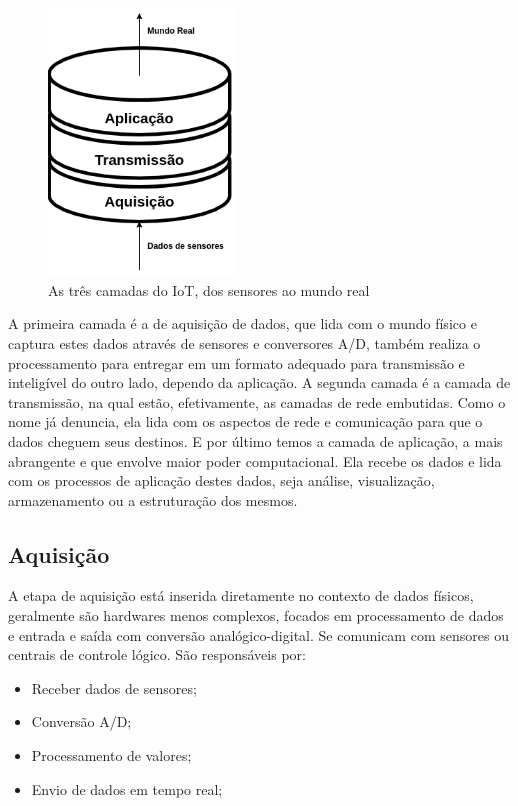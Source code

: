 \begin{figure}[h!]
\centering
\includegraphics[width=5cm]{./02_Capitulos/02_Cap1/figures/iot_stack}
\caption{As três camadas do IoT, dos sensores ao mundo real}
\label{fig:1.2.0/camadas_iot}
\end{figure}

A primeira camada é a de aquisição de dados, que lida com o mundo físico e captura estes dados através de sensores e conversores A/D, também realiza o processamento para entregar em um formato adequado para transmissão e inteligível do outro lado, dependo da aplicação. A segunda camada é a camada de transmissão, na qual estão, efetivamente, as camadas de rede embutidas. Como o nome já denuncia, ela lida com os aspectos de rede e comunicação para que o dados cheguem seus destinos. E por último temos a camada de aplicação, a mais abrangente e que envolve maior poder computacional. Ela recebe os dados e lida com os processos de aplicação destes dados, seja análise, visualização, armazenamento ou a estruturação dos mesmos.

\subsection{Aquisição}
\label{subsection:aquisicao}

A etapa de aquisição está inserida diretamente no contexto de dados físicos, geralmente são hardwares menos complexos, focados em processamento de dados e entrada e saída com conversão analógico-digital. Se comunicam com sensores ou centrais de controle lógico. São responsáveis por:

\begin{itemize}
	\item Receber dados de sensores;
	\item Conversão A/D;
	\item Processamento de valores;
	\item Envio de dados em tempo real;
\end{itemize} 

